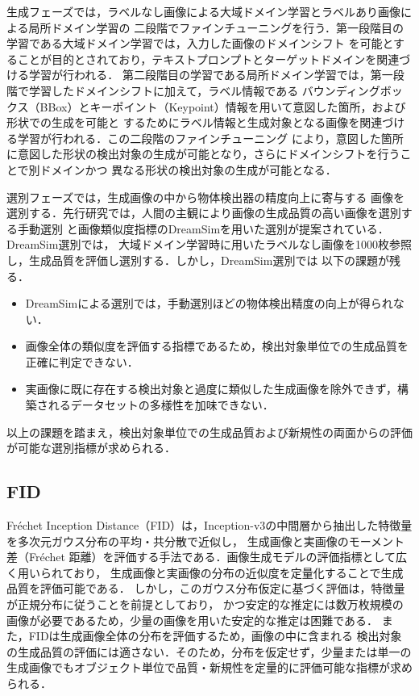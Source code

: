 \documentclass[Japanese]{dicomopapers}
\begin{document}
  生成フェーズでは，ラベルなし画像による大域ドメイン学習とラベルあり画像による局所ドメイン学習の
  二段階でファインチューニングを行う．第一段階目の学習である大域ドメイン学習では，入力した画像のドメインシフト
  を可能とすることが目的とされており，テキストプロンプトとターゲットドメインを関連づける学習が行われる．
  第二段階目の学習である局所ドメイン学習では，第一段階で学習したドメインシフトに加えて，ラベル情報である
  バウンディングボックス（BBox）とキーポイント（Keypoint）情報を用いて意図した箇所，および形状での生成を可能と
  するためにラベル情報と生成対象となる画像を関連づける学習が行われる．この二段階のファインチューニング
  により，意図した箇所に意図した形状の検出対象の生成が可能となり，さらにドメインシフトを行うことで別ドメインかつ
  異なる形状の検出対象の生成が可能となる．

  選別フェーズでは，生成画像の中から物体検出器の精度向上に寄与する
  画像を選別する．先行研究では，人間の主観により画像の生成品質の高い画像を選別する手動選別
  と画像類似度指標のDreamSim\cite{fu2023dreamsim}を用いた選別が提案されている．DreamSim選別では，
  大域ドメイン学習時に用いたラベルなし画像を1000枚参照し，生成品質を評価し選別する．しかし，DreamSim選別では
  以下の課題が残る．
  \begin{itemize}
    \item DreamSimによる選別では，手動選別ほどの物体検出精度の向上が得られない．
    \item 画像全体の類似度を評価する指標であるため，検出対象単位での生成品質を正確に判定できない．
    \item 実画像に既に存在する検出対象と過度に類似した生成画像を除外できず，構築されるデータセットの多様性を加味できない．
  \end{itemize}
  以上の課題を踏まえ，検出対象単位での生成品質および新規性の両面からの評価が可能な選別指標が求められる．
  \subsection{FID}%

  Fréchet Inception Distance（FID）は，Inception-v3\cite{szegedy2016inception-v3}の中間層から抽出した特徴量を多次元ガウス分布の平均・共分散で近似し，
  生成画像と実画像のモーメント差（Fréchet 距離）を評価する手法である\cite{heusel2017gans}．画像生成モデルの評価指標として広く用いられており，
  生成画像と実画像の分布の近似度を定量化することで生成品質を評価可能である．
  しかし，このガウス分布仮定に基づく評価は，特徴量が正規分布に従うことを前提としており，
  かつ安定的な推定には数万枚規模の画像が必要であるため，少量の画像を用いた安定的な推定は困難である．
  また，FIDは生成画像全体の分布を評価するため，画像の中に含まれる
  検出対象の生成品質の評価には適さない．そのため，分布を仮定せず，少量または単一の生成画像でもオブジェクト単位で品質・新規性を定量的に評価可能な指標が求められる．
\end{document}
